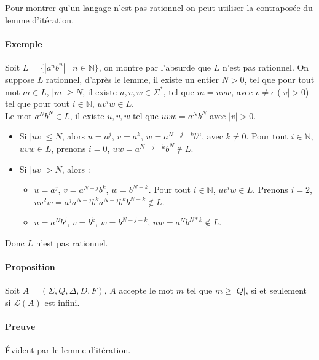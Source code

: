 
Pour montrer qu'un langage n'est pas rationnel on peut utiliser la contraposée du lemme d'itération.


\paragraph{Exemple} %
\label{par:exemple}

Soit $L=\{\left|a^nb^n\right| \mid n \in \mathbb{N}\}$, on montre par l'absurde que $L$ n'est pas rationnel. On suppose $L$ rationnel, d'après le lemme, il existe un entier $N > 0$, tel que pour tout mot $m \in L$, $\left|m\right| \geq  N$, il existe $u, v, w \in \Sigma^*$, tel que $m=uvw$, avec $v \not = \epsilon$ ($\left|v\right| > 0$) tel que pour tout $i \in \mathbb{N}$, $uv^iw \in L$.\\
Le mot $a^Nb^N \in L$, il existe $u,v,w$ tel que $uvw=a^Nb^N$ avec $\left|v\right| > 0$.

\begin{itemize}
	\item Si $\left|uv\right| \leq N$, alors $u=a^j$, $v=a^k$, $w=a^{N-j-k}b^n$, avec $k \not = 0$. Pour tout $i \in \mathbb{N}$, $uvw \in L$, prenons $i=0$, $uw=a^{N-j-k}b^N \not \in L$.
	\item Si $\left|uv\right| > N$, alors :
	\begin{itemize}
		\item $u=a^j$, $v=a^{N-j}b^k$, $w=b^{N-k}$. Pour tout $i \in \mathbb{N}$, $uv^iw \in L$. Prenons $i=2$, $uv^2w = a^j a^{N-j} b^k a^{N-j} b^k b^{N-k} \not \in L$.
		\item $u=a^N b^j$, $v=b^k$, $w=b^{N-j-k}$, $uw = a^N b^{N*k} \not \in L$.
	\end{itemize}
\end{itemize}

Donc $L$ n'est pas rationnel.



\paragraph{Proposition} %
\label{par:proposition}

Soit $A=(\Sigma,Q,\Delta,D,F)$, $A$ accepte le mot $m$ tel que $m \geq \left|Q\right|$, si et seulement si $\mathcal{L}(A)$ est infini.



\paragraph{Preuve} %
\label{par:preuve}

Évident par le lemme d'itération.





